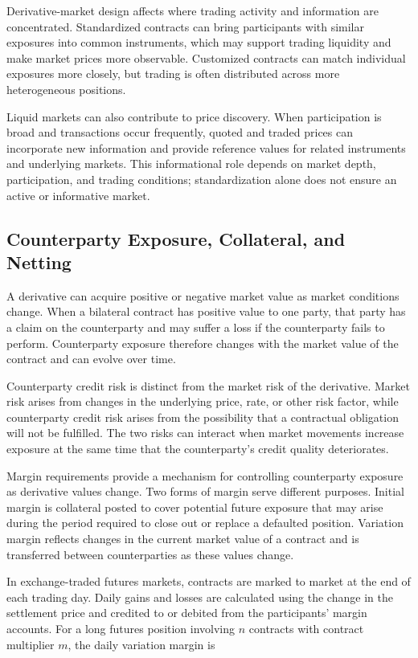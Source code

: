 Derivative-market design affects where trading activity and information are concentrated. Standardized contracts can bring participants with similar exposures into common instruments, which may support trading liquidity and make market prices more observable. Customized contracts can match individual exposures more closely, but trading is often distributed across more heterogeneous positions.

Liquid markets can also contribute to price discovery. When participation is broad and transactions occur frequently, quoted and traded prices can incorporate new information and provide reference values for related instruments and underlying markets. This informational role depends on market depth, participation, and trading conditions; standardization alone does not ensure an active or informative market.


\subsection{Counterparty Exposure, Collateral, and Netting}

A derivative can acquire positive or negative market value as market conditions change. When a bilateral contract has positive value to one party, that party has a claim on the counterparty and may suffer a loss if the counterparty fails to perform. Counterparty exposure therefore changes with the market value of the contract and can evolve over time.

Counterparty credit risk is distinct from the market risk of the derivative. Market risk arises from changes in the underlying price, rate, or other risk factor, while counterparty credit risk arises from the possibility that a contractual obligation will not be fulfilled. The two risks can interact when market movements increase exposure at the same time that the counterparty's credit quality deteriorates.

Margin requirements provide a mechanism for
controlling counterparty exposure as derivative
values change. Two forms of margin serve different
purposes. Initial margin is collateral posted to
cover potential future exposure that may arise
during the period required to close out or replace
a defaulted position. Variation margin reflects
changes in the current market value of a contract
and is transferred between counterparties as
these values change.

In exchange-traded futures markets, contracts are
marked to market at the end of each trading day.
Daily gains and losses are calculated using the
change in the settlement price and credited to
or debited from the participants' margin accounts.
For a long futures position involving $n$ contracts
with contract multiplier $m$, the daily variation
margin is

